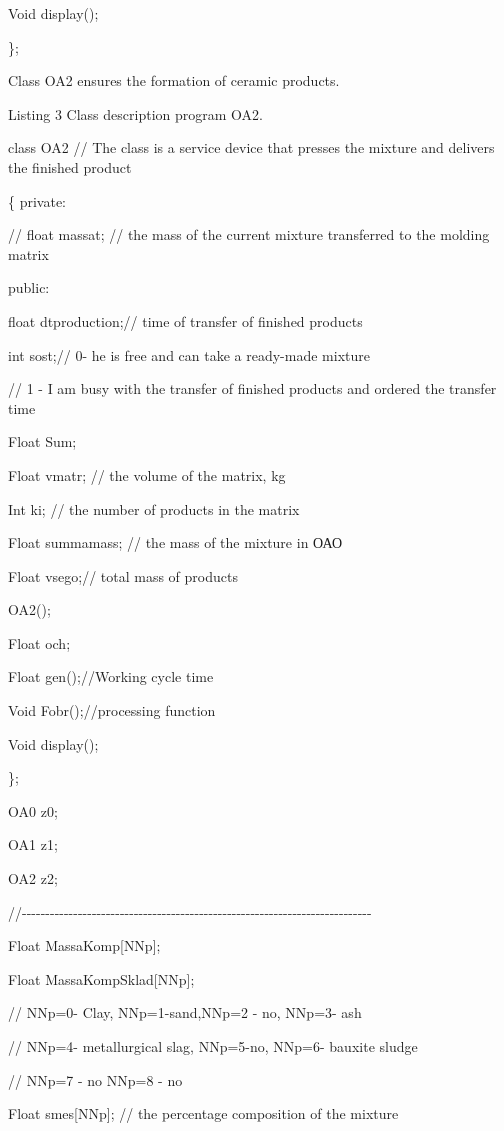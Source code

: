 Void display();

\};

Class OA2 ensures the formation of ceramic products.

Listing 3 Class description program OA2.

class OA2 // The class is a service device that presses the mixture and
delivers the finished product

\{ private:

// float massat; // the mass of the current mixture transferred to the
molding matrix

public:

float dtproduction;// time of transfer of finished products

int sost;// 0- he is free and can take a ready-made mixture

// 1 - I am busy with the transfer of finished products and ordered the
transfer time

Float Sum;

Float vmatr; // the volume of the matrix, kg

Int ki; // the number of products in the matrix

Float summamass; // the mass of the mixture in ОАО

Float vsego;// total mass of products

OA2();

Float och;

Float gen();//Working cycle time

Void Fobr();//processing function

Void display();

\};

OA0 z0;

OA1 z1;

OA2 z2;

//-\/-\/-\/-\/-\/-\/-\/-\/-\/-\/-\/-\/-\/-\/-\/-\/-\/-\/-\/-\/-\/-\/-\/-\/-\/-\/-\/-\/-\/-\/-\/-\/-\/-\/-\/-\/-\/-\/-\/-\/-\/-\/-\/-\/-\/-\/-\/-\/-\/-\/-\/-\/-\/-\/-\/-\/-\/-\/-\/-\/-\/-\/-\/-\/-\/-\/-\/-\/-\/-\/-\/-\/-\/-\/-

Float MassaKomp{[}NNp{]};

Float MassaKompSklad{[}NNp{]};

// NNp=0- Clay, NNp=1-sand,NNp=2 - no, NNp=3- ash

// NNp=4- metallurgical slag, NNp=5-no, NNp=6- bauxite sludge

// NNp=7 - no NNp=8 - no

Float smes{[}NNp{]}; // the percentage composition of the mixture

